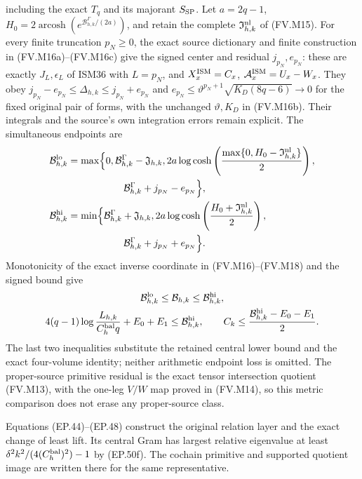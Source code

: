 including the exact $T_q$ and its majorant $S_{\rm SP}$.
Let $a=2q-1$, $H_0=2\operatorname{arcosh}
(e^{\mathcal B^\Gamma_{h,k}/(2a)})$, and retain the complete
$\mathfrak I_{h,k}^{\rm nl}$ of (FV.M15). For every finite truncation
$p_N\ge0$, the exact source dictionary and finite construction in
(FV.M16a)--(FV.M16c) give the signed center and residual
$j_{p_N},e_{p_N}$: these are exactly $J_L,\epsilon_L$ of ISM36
with $L=p_N$, and $X_x^{\rm ISM}=C_x$, $\mathcal A_x^{\rm ISM}=U_x-W_x$.
They obey $j_{p_N}-e_{p_N}\le\Delta_{h,k}\le j_{p_N}+e_{p_N}$ and
$e_{p_N}\le\vartheta^{p_N+1}\sqrt{K_D(8q-6)}\to0$ for the fixed
original pair of forms, with the unchanged $\vartheta,K_D$ in (FV.M16b).
Their integrals and the source's own integration errors remain explicit.
The simultaneous endpoints are
\[
 \begin{aligned}
 \mathcal B_{h,k}^{\rm lo}
 &=\max\Bigl\{0,\mathcal B^\Gamma_{h,k}-\mathfrak J_{h,k},
 2a\log\cosh\left(\frac{\max\{0,H_0-\mathfrak I_{h,k}^{\rm nl}\}}2\right),\\
 &\hspace{20mm}\mathcal B^\Gamma_{h,k}+j_{p_N}-e_{p_N}\Bigr\},\\
 \mathcal B_{h,k}^{\rm hi}
 &=\min\Bigl\{\mathcal B^\Gamma_{h,k}+\mathfrak J_{h,k},
 2a\log\cosh\left(\frac{H_0+\mathfrak I_{h,k}^{\rm nl}}2\right),\\
 &\hspace{20mm}\mathcal B^\Gamma_{h,k}+j_{p_N}+e_{p_N}\Bigr\}.
 \end{aligned}
\]
Monotonicity of the exact inverse coordinate in (FV.M16)--(FV.M18)
and the signed bound give
\[
 \begin{gathered}
 \mathcal B_{h,k}^{\rm lo}\le\mathcal B_{h,k}
                  \le\mathcal B_{h,k}^{\rm hi},\\
 4(q-1)\log\frac{L_{h,k}}{C_h^{\rm bal}q}+E_0+E_1
       \le\mathcal B_{h,k}^{\rm hi},\qquad
 C_k\le\frac{\mathcal B_{h,k}^{\rm hi}-E_0-E_1}{2}.
 \end{gathered}
\]
The last two inequalities substitute the retained central lower bound
and the exact four-volume identity; neither arithmetic endpoint loss
is omitted. The proper-source primitive residual is the exact tensor
intersection quotient (FV.M13), with the one-leg $V/W$ map proved in
(FV.M14), so this metric comparison does not erase any proper-source
class.

Equations (EP.44)--(EP.48) construct the original relation layer
and the exact change of least lift. Its central Gram has largest
relative eigenvalue at least
$\delta^2k^2/(4(C_h^{\rm bal})^2)-1$ by (EP.50f).
The cochain primitive and supported quotient image are written
there for the same representative.

